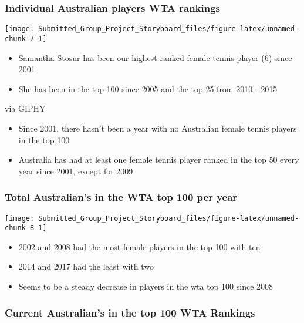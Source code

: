 \documentclass[]{article}
\providecommand{\tightlist}{%
  \setlength{\itemsep}{0pt}\setlength{\parskip}{0pt}}
\begin{document}
\subsubsection{Individual Australian players WTA
rankings}\label{individual-australian-players-wta-rankings}

\begin{center}\texttt{[image: Submitted\_Group\_Project\_Storyboard\_files/figure-latex/unnamed-chunk-7-1]} \end{center}

\begin{itemize}
\tightlist
\item
  Samantha Stosur has been our highest ranked female tennis player (6)
  since 2001
\item
  She has been in the top 100 since 2005 and the top 25 from 2010 - 2015
\end{itemize}

via GIPHY

\begin{itemize}
\tightlist
\item
  Since 2001, there hasn't been a year with no Australian female tennis
  players in the top 100
\item
  Australia has had at least one female tennis player ranked in the top
  50 every year since 2001, except for 2009
\end{itemize}

\subsubsection{Total Australian's in the WTA top 100 per
year}\label{total-australians-in-the-wta-top-100-per-year}

\begin{center}\texttt{[image: Submitted\_Group\_Project\_Storyboard\_files/figure-latex/unnamed-chunk-8-1]} \end{center}

\begin{itemize}
\tightlist
\item
  2002 and 2008 had the most female players in the top 100 with ten
\item
  2014 and 2017 had the least with two
\item
  Seems to be a steady decrease in players in the wta top 100 since 2008
\end{itemize}

\subsubsection{Current Australian's in the top 100 WTA
Rankings}\label{current-australians-in-the-top-100-wta-rankings}
\end{document}
